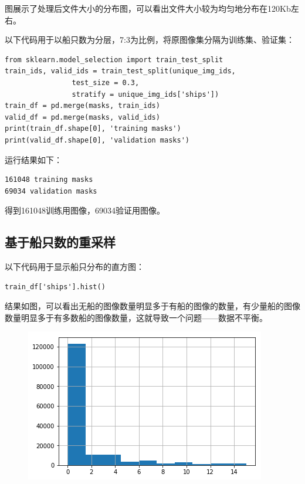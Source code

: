 图展示了处理后文件大小的分布图，可以看出文件大小较为均匀地分布在120Kb左右。

以下代码用于以船只数为分层，7:3为比例，将原图像集分隔为训练集、验证集：

\begin{verbatim}
from sklearn.model_selection import train_test_split
train_ids, valid_ids = train_test_split(unique_img_ids, 
                test_size = 0.3, 
                stratify = unique_img_ids['ships'])
train_df = pd.merge(masks, train_ids)
valid_df = pd.merge(masks, valid_ids)
print(train_df.shape[0], 'training masks')
print(valid_df.shape[0], 'validation masks')
\end{verbatim}

运行结果如下：

\begin{verbatim}
161048 training masks
69034 validation masks
\end{verbatim}

得到161048训练用图像，69034验证用图像。

\subsection{基于船只数的重采样}

以下代码用于显示船只分布的直方图：

\begin{verbatim}
train_df['ships'].hist()
\end{verbatim}

结果如图，可以看出无船的图像数量明显多于有船的图像的数量，有少量船的图像数量明显多于有多数船的图像数量，这就导致一个问题------数据不平衡。

\begin{figure}
\centering
\includegraphics{preprocessing_pic/4.png}
\caption{}
\end{figure}

